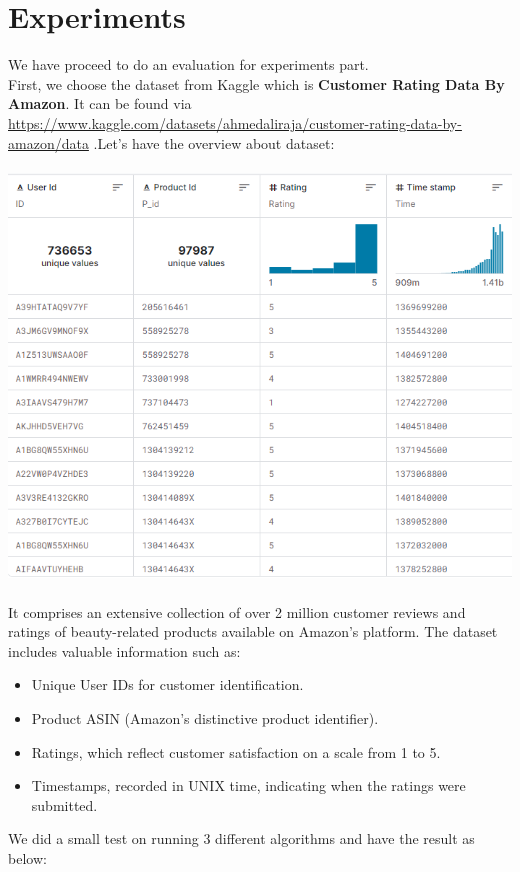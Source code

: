 \section{Experiments}
We have proceed to do an evaluation for experiments part.\\
First, we choose the dataset from Kaggle which is \textbf{Customer Rating Data By Amazon}. It can be found via \url{https://www.kaggle.com/datasets/ahmedaliraja/customer-rating-data-by-amazon/data} .Let's have the overview about dataset:\\
\\
\includegraphics[scale=0.6]{image/dataset.png}
\\
\\
It comprises an extensive collection of over 2 million customer reviews and ratings of beauty-related products available on Amazon's platform. The dataset includes valuable information such as:
\begin{itemize}
    \item Unique User IDs for customer identification.
    \item Product ASIN (Amazon's distinctive product identifier).
    \item Ratings, which reflect customer satisfaction on a scale from 1 to 5.
    \item Timestamps, recorded in UNIX time, indicating when the ratings were submitted.
\end{itemize}
\indent  We did a small test on running 3 different algorithms and have the result as below:
